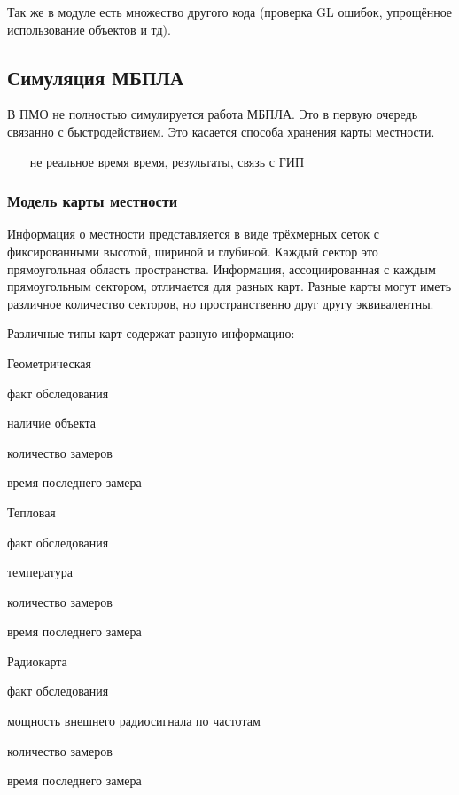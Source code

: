Так же в модуле есть множество другого кода (проверка GL ошибок,
упрощённое использование объектов и тд).

\newpage
\subsection{Симуляция МБПЛА}

В ПМО не полностью симулируется работа МБПЛА. Это в первую очередь
связанно с быстродействием. Это касается способа хранения карты
местности.

~~~
не реальное время время, результаты, связь с ГИП
~~~

\newpage
\subsubsection{Модель карты местности}

Информация о местности представляется в виде трёхмерных сеток с фиксированными
высотой, шириной и глубиной. Каждый сектор это прямоугольная область пространства.
Информация, ассоциированная с каждым прямоугольным сектором, отличается для разных
карт. Разные карты могут иметь различное количество секторов, но пространственно
друг другу эквивалентны.

Различные типы карт содержат разную информацию:

\begin{mintemize}

\item Геометрическая

    \begin{mintemize}
    \item факт обследования
    \item наличие объекта
    \item количество замеров
    \item время последнего замера
    \end{mintemize}

\item Тепловая

    \begin{mintemize}
    \item факт обследования
    \item температура
    \item количество замеров
    \item время последнего замера
    \end{mintemize}

\item Радиокарта

    \begin{mintemize}
    \item факт обследования
    \item мощность внешнего радиосигнала по частотам
    \item количество замеров
    \item время последнего замера
    \end{mintemize}

\end{mintemize}

